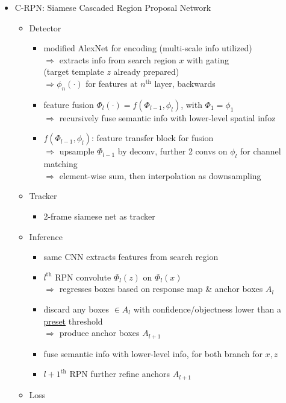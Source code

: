 \begin{itemize}
\item C-RPN: Siamese Cascaded Region Proposal Network
	\begin{itemize}
	\item Detector
		\begin{itemize}
		\item modified AlexNet for encoding (multi-scale info utilized) \\
		$\Rightarrow$ extracts info from search region $x$ with gating \\ 
		(target template $z$ already prepared) \\
		$\Rightarrow \phi_n(\cdot)$ for features at $n^\text{th}$ layer, backwards
		\item feature fusion $\Phi_l(\cdot) = f \left( \Phi_{l-1}, \phi_l \right)$, with $\Phi_1 = \phi_1$ \\
		$\Rightarrow$ recursively fuse semantic info with lower-level spatial infoz
		\item $f(\Phi_{l-1}, \phi_l)$: feature transfer block for fusion \\
		$\Rightarrow$ upsample $\Phi_{l-1}$ by deconv, further 2 convs on $\phi_l$ for channel matching \\
		$\Rightarrow$ element-wise sum, then interpolation as downsampling
		\end{itemize}
	\item Tracker
		\begin{itemize}
		\item 2-frame siamese net as tracker
		\end{itemize}
	\item Inference
		\begin{itemize}
		\item same CNN extracts features from search region
		\item $l^\text{th}$ RPN convolute $\Phi_{l}(z)$ on $\Phi_{l}(x)$ \\
		$\Rightarrow$ regresses boxes based on response map \& anchor boxes $A_{l}$
		\item discard any boxes $\in A_l$ with confidence/objectness lower than a \underline{preset} threshold \\
		$\Rightarrow$ produce anchor boxes $A_{l+1}$
		\item fuse semantic info with lower-level info, for both branch for $x, z$
		\item $l+1^\text{th}$ RPN further refine anchors $A_{l+1}$
		\end{itemize}
	\item Loss

\end{itemize}
\end{itemize}
